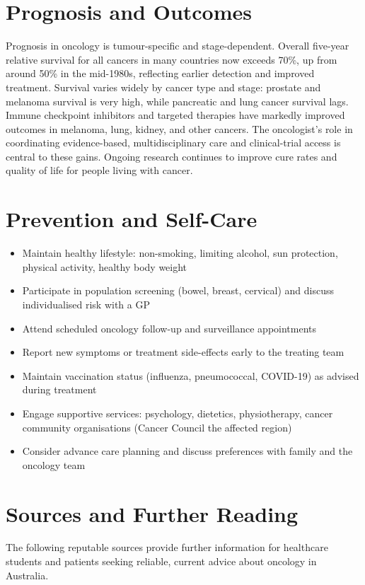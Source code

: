 \section*{Prognosis and Outcomes}
Prognosis in oncology is tumour-specific and stage-dependent. Overall five-year relative survival for all cancers in many countries now exceeds 70\%, up from around 50\% in the mid-1980s, reflecting earlier detection and improved treatment. Survival varies widely by cancer type and stage: prostate and melanoma survival is very high, while pancreatic and lung cancer survival lags. Immune checkpoint inhibitors and targeted therapies have markedly improved outcomes in melanoma, lung, kidney, and other cancers. The oncologist's role in coordinating evidence-based, multidisciplinary care and clinical-trial access is central to these gains. Ongoing research continues to improve cure rates and quality of life for people living with cancer.

\section*{Prevention and Self-Care}
\begin{itemize}
    \item Maintain healthy lifestyle: non-smoking, limiting alcohol, sun protection, physical activity, healthy body weight
    \item Participate in population screening (bowel, breast, cervical) and discuss individualised risk with a GP
    \item Attend scheduled oncology follow-up and surveillance appointments
    \item Report new symptoms or treatment side-effects early to the treating team
    \item Maintain vaccination status (influenza, pneumococcal, COVID-19) as advised during treatment
    \item Engage supportive services: psychology, dietetics, physiotherapy, cancer community organisations (Cancer Council the affected region)
    \item Consider advance care planning and discuss preferences with family and the oncology team
\end{itemize}

\section*{Sources and Further Reading}
The following reputable sources provide further information for healthcare students and patients seeking reliable, current advice about oncology in Australia.


